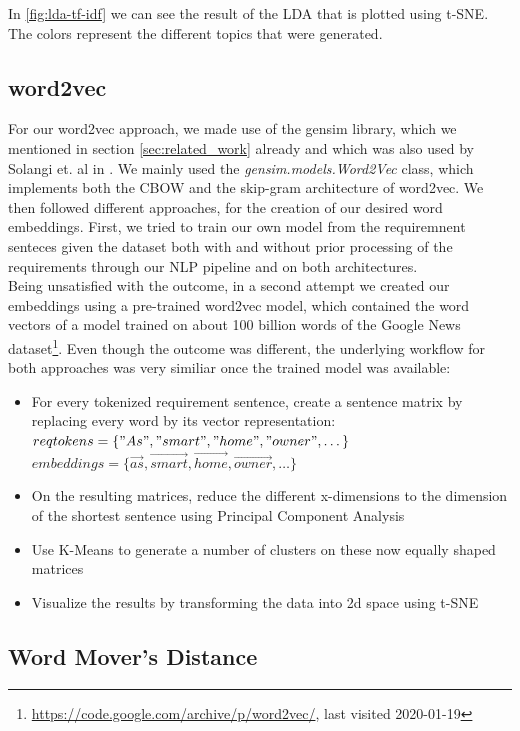 In \autoref{fig:lda-tf-idf} we can see the result of the LDA that is plotted using t-SNE. The colors represent the different topics that were generated.

\subsection{word2vec} %
\label{sub:own_word2vec}
For our word2vec approach, we made use of the gensim library, which we mentioned in section \ref{sec:related_work} already and which was also used by Solangi et. al in \cite{solangi_review_2018}. We mainly used the \emph{gensim.models.Word2Vec} class, which implements both the CBOW and the skip-gram architecture of word2vec. We then followed different approaches, for the creation of our desired word embeddings. First, we tried to train our own model from the requiremnent senteces given the \crowdre{} dataset both with and without prior processing of the requirements through our NLP pipeline and on both architectures.\\
Being unsatisfied with the outcome, in a second attempt we created our embeddings using a pre-trained word2vec model, which contained the word vectors of a model trained on about 100 billion words of the Google News dataset\footnote{\url{https://code.google.com/archive/p/word2vec/}, last visited 2020-01-19}. Even though the outcome was different, the underlying workflow for both approaches was very similiar once the trained model was available:
\begin{itemize}
	\item For every tokenized requirement sentence, create a sentence matrix by replacing every word by its vector representation:\\
	$reqtokens = \{"As", "smart", "home", "owner", \dots\}$\\
	$embeddings = \{ \vec{as}, \vec{smart}, \vec{home}, \vec{owner}, \dots \}$
	\item On the resulting matrices, reduce the different x-dimensions to the dimension of the shortest sentence using Principal Component Analysis
	\item Use K-Means to generate a number of clusters on these now equally shaped matrices
	\item Visualize the results by transforming the data into 2d space using t-SNE\cite{maaten_visualizing_2008}
\end{itemize}

\subsection{Word Mover's Distance} %
\label{sub:own_wmd}

